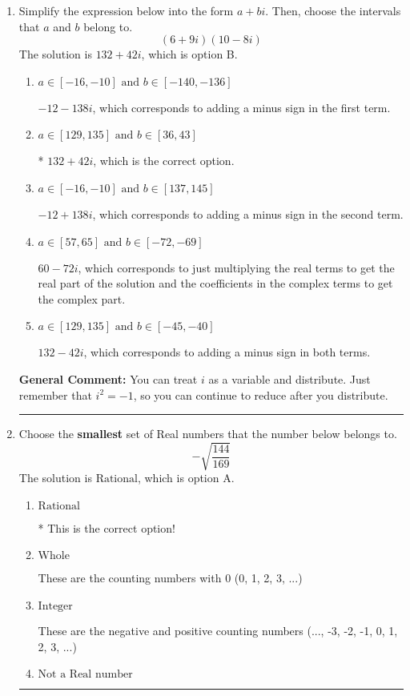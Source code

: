 \documentclass{extbook}[14pt]
\newcommand{\litem}[1]{\item #1

\rule{\textwidth}{0.4pt}}
\begin{document}
\begin{enumerate}
{ Irrational numbers are more than just square root of 3: adding or subtracting values from square root of 3 is also irrational.
}
\litem{
Simplify the expression below into the form $a+bi$. Then, choose the intervals that $a$ and $b$ belong to.
\[ (6 + 9 i)(10 - 8 i) \]The solution is \( 132 + 42 i \), which is option B.\begin{enumerate}[label=\Alph*.]
\item \( a \in [-16, -10] \text{ and } b \in [-140, -136] \)

 $-12 - 138 i$, which corresponds to adding a minus sign in the first term.
\item \( a \in [129, 135] \text{ and } b \in [36, 43] \)

* $132 + 42 i$, which is the correct option.
\item \( a \in [-16, -10] \text{ and } b \in [137, 145] \)

 $-12 + 138 i$, which corresponds to adding a minus sign in the second term.
\item \( a \in [57, 65] \text{ and } b \in [-72, -69] \)

 $60 - 72 i$, which corresponds to just multiplying the real terms to get the real part of the solution and the coefficients in the complex terms to get the complex part.
\item \( a \in [129, 135] \text{ and } b \in [-45, -40] \)

 $132 - 42 i$, which corresponds to adding a minus sign in both terms.
\end{enumerate}

\textbf{General Comment:} You can treat $i$ as a variable and distribute. Just remember that $i^2=-1$, so you can continue to reduce after you distribute.
}
\litem{
Choose the \textbf{smallest} set of Real numbers that the number below belongs to.
\[ -\sqrt{\frac{144}{169}} \]The solution is \( \text{Rational} \), which is option A.\begin{enumerate}[label=\Alph*.]
\item \( \text{Rational} \)

* This is the correct option!
\item \( \text{Whole} \)

These are the counting numbers with 0 (0, 1, 2, 3, ...)
\item \( \text{Integer} \)

These are the negative and positive counting numbers (..., -3, -2, -1, 0, 1, 2, 3, ...)
\item \( \text{Not a Real number} \)


\end{enumerate}}
\end{enumerate}
\end{document}
